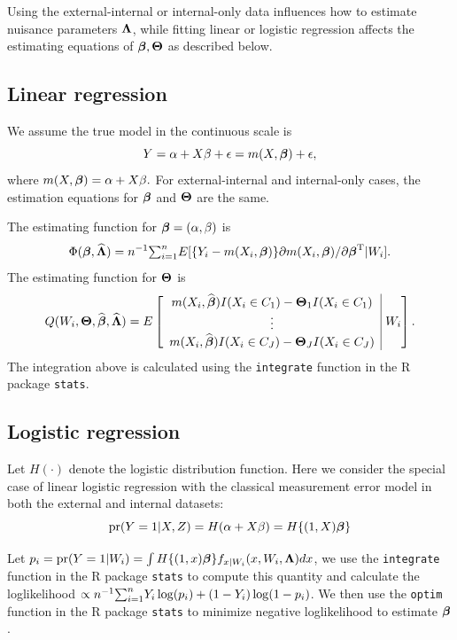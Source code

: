 \documentclass[15 pt,]{article}
\begin{document}
Using the external-internal or internal-only data influences how to
estimate nuisance parameters \(\mbox{\boldmath $\Lambda$}\), while fitting linear or
logistic regression affects the estimating equations of
\(\mbox{\boldmath $\beta$}, \mbox{\boldmath $\Theta$}\) as described below.

\subsection{Linear regression}\label{linear-regression}

We assume the true model in the continuous scale is\[
                        Y  = \alpha + X \beta+\epsilon =  m(X, \mbox{\boldmath $\beta$}) + \epsilon,\]
where \(m(X, \mbox{\boldmath $\beta$}) = \alpha + X\beta.\) For external-internal and
internal-only cases, the estimation equations for \(\mbox{\boldmath $\beta$}\) and
\(\mbox{\boldmath $\Theta$}\) are the same.

The estimating function for \(\mbox{\boldmath $\beta$}=(\alpha,\beta)\) is \[
\Phi ( \mbox{\boldmath $\beta$},\widehat{\mbox{\boldmath $\Lambda$}}) = n^{-1}\hbox{$\sum_{i=1}^{n}$} E[\{Y_i - m(X_i, \mbox{\boldmath $\beta$}) \}\partial m(X_i, \mbox{\boldmath $\beta$}) / \partial\mbox{\boldmath $\beta$}^{\rm T}  \vert W_i ].
\] The estimating function for \(\mbox{\boldmath $\Theta$}\) is \[
Q(W_i,\bTheta, \wh\bbeta,\wh\bLambda)  =  E \left[\begin{array}{c}
m(X_i,\wh\bbeta) I(X_i \in C_1) - \bTheta_1 I(X_i \in C_1) \\
\vdots \\
m(X_i,\wh\bbeta) I(X_i \in C_J) - \bTheta_J I(X_i \in C_J)
\end{array} \vline \hbox{ } W_i \right].
\] The integration above is calculated using the \texttt{integrate}
function in the R package \texttt{stats}.

\subsection{Logistic regression}\label{logistic-regression}

Let \(H(\cdot)\) denote the logistic distribution function. Here we
consider the special case of linear logistic regression with the
classical measurement error model in both the external and internal
datasets: \[
                \hbox{pr}(Y = 1 \vert X,Z) = H(\alpha + X\beta) =   H\{(1, X)\mbox{\boldmath $\beta$}\}\]

Let
\(p_i = \hbox{pr}(Y=1 \vert W_i) = \int H\{(1, x)\mbox{\boldmath $\beta$}\} f_{x\vert W_i}(x,W_i,\mbox{\boldmath $\Lambda$}) dx\),
we use the \texttt{integrate} function in the R package \texttt{stats}
to compute this quantity and calculate the loglikelihood
\(\propto n^{-1}\hbox{$\sum_{i=1}^{n}$} Y_i\log(p_i)+(1-Y_i)\log(1-p_i)\). We then use the
\texttt{optim} function in the R package \texttt{stats} to minimize
negative loglikelihood to estimate \(\mbox{\boldmath $\beta$}\).
\end{document}

